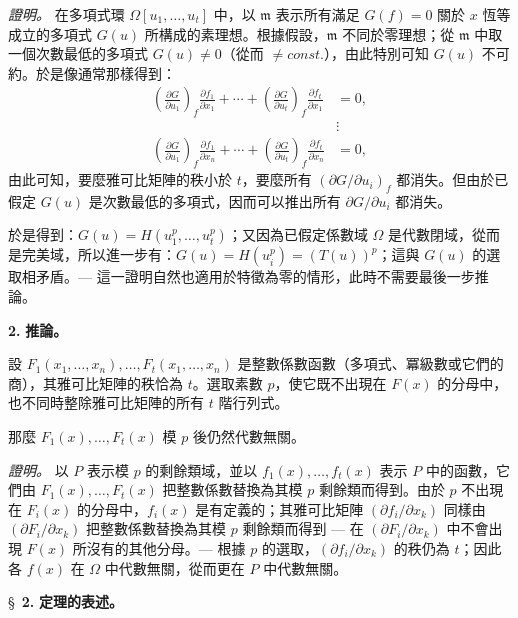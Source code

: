 \documentclass[11pt]{article}
\begin{document}
\noindent\textit{證明。}
在多項式環 $\Omega[u_1,\ldots,u_t]$ 中，以 $\mathfrak{m}$ 表示所有滿足 $G(f) = 0$ 關於 $x$ 恆等成立的多項式 $G(u)$ 所構成的素理想。根據假設，$\mathfrak{m}$ 不同於零理想；從 $\mathfrak{m}$ 中取一個次數最低的多項式 $G(u) \neq 0$（從而 $\neq {const.}$），由此特別可知 $G(u)$ 不可約。於是像通常那樣得到：
\[
\begin{aligned}
\left(\frac{\partial G}{\partial u_1}\right)_{f}\frac{\partial f_1}{\partial x_1}
 +\cdots+
\left(\frac{\partial G}{\partial u_t}\right)_{f}\frac{\partial f_t}{\partial x_1}&=0,\\[-1mm]
&\vdots\\[-1mm]
\left(\frac{\partial G}{\partial u_1}\right)_{f}\frac{\partial f_1}{\partial x_n}
 +\cdots+
\left(\frac{\partial G}{\partial u_t}\right)_{f}\frac{\partial f_t}{\partial x_n}&=0,
\end{aligned}
\]
由此可知，要麼雅可比矩陣的秩小於 $t$，要麼所有 $\left(\partial G/\partial u_i\right)_{f}$ 都消失。但由於已假定 $G(u)$ 是次數最低的多項式，因而可以推出所有 $\partial G/\partial u_i$ 都消失。

於是得到：$G(u)=H(u_1^p,\ldots,u_t^p)$；又因為已假定係數域 $\Omega$ 是代數閉域，從而是完美域，所以進一步有：$G(u)=H(u_i^p)=(T(u))^p$；這與 $G(u)$ 的選取相矛盾。--- 這一證明自然也適用於特徵為零的情形，此時不需要最後一步推論。

\medskip\noindent\textbf{2.} \textbf{推論。}

設 $F_1(x_1,\ldots,x_n),\ldots,F_t(x_1,\ldots,x_n)$ 是整數係數函數（多項式、冪級數或它們的商），其雅可比矩陣的秩恰為 $t$。選取素數 $p$，使它既不出現在 $F(x)$ 的分母中，也不同時整除雅可比矩陣的所有 $t$ 階行列式。

那麼 $F_1(x),\ldots,F_t(x)$ 模 $p$ 後仍然代數無關。

\noindent\textit{證明。}
以 $P$ 表示模 $p$ 的剩餘類域，並以 $f_1(x),\ldots,f_t(x)$ 表示 $P$ 中的函數，它們由 $F_1(x),\ldots,F_t(x)$ 把整數係數替換為其模 $p$ 剩餘類而得到。由於 $p$ 不出現在 $F_i(x)$ 的分母中，$f_i(x)$ 是有定義的；其雅可比矩陣 $(\partial f_i/\partial x_k)$ 同樣由 $(\partial F_i/\partial x_k)$ 把整數係數替換為其模 $p$ 剩餘類而得到 --- 在 $(\partial F_i/\partial x_k)$ 中不會出現 $F(x)$ 所沒有的其他分母。--- 根據 $p$ 的選取，$(\partial f_i/\partial x_k)$ 的秩仍為 $t$；因此各 $f(x)$ 在 $\Omega$ 中代數無關，從而更在 $P$ 中代數無關。

\bigskip
\S~\textbf{2.}
\textbf{定理的表述。}

\smallskip
\end{document}
